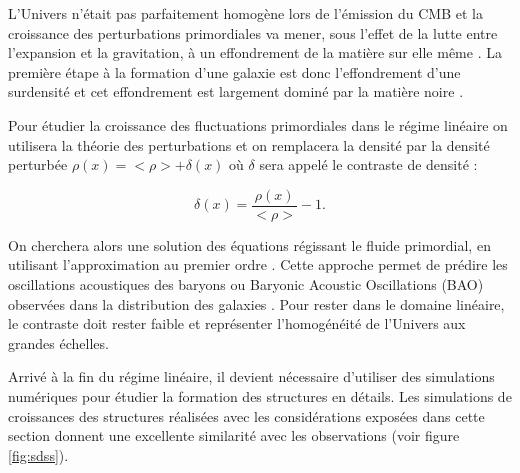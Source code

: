 L'Univers n'était pas parfaitement homogène lors de l'émission du \ac{CMB} et la croissance des perturbations primordiales va mener, sous l'effet de la lutte entre l'expansion et la gravitation, à un effondrement de la matière sur elle même \citep{1968ApJ...151..459S}.
La première étape à la formation d'une galaxie est donc l'effondrement d'une surdensité et cet effondrement est largement dominé par la matière noire \citep{1985ApJ...292..371D}.

Pour étudier la croissance des fluctuations primordiales dans le régime linéaire on utilisera la théorie des perturbations et on remplacera la densité par la densité perturbée $\rho(x) = <\rho> + \delta(x)$ où $\delta$ sera appelé le contraste de densité :

\begin{equation}
\delta(x) = \frac{\rho(x)}{<\rho>} -1.
\end{equation}

On cherchera alors une solution des équations régissant le fluide primordial, en utilisant l'approximation au premier ordre \citep{1999coph.book.....P}.
Cette approche permet de prédire les oscillations acoustiques des baryons ou Baryonic Acoustic Oscillations (BAO) observées dans la distribution des galaxies \citep{2005ApJ...633..560E}.
Pour rester dans le domaine linéaire, le contraste doit rester faible et représenter l'homogénéité de l'Univers aux grandes échelles.

Arrivé à la fin du régime linéaire, il devient nécessaire d'utiliser des simulations numériques pour étudier la formation des structures en détails.
Les simulations de croissances des structures réalisées avec les considérations exposées dans cette section donnent une excellente similarité avec les observations (voir figure \ref{fig:sdss}).

